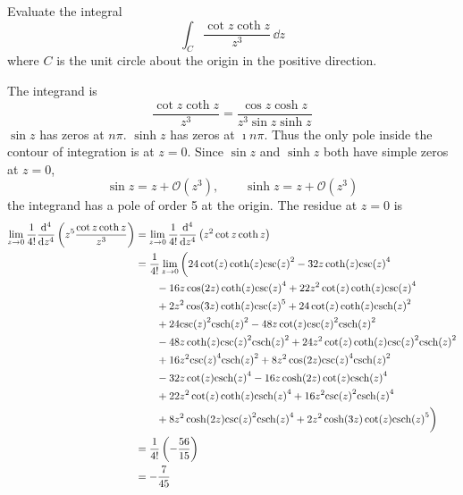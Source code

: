 \begin{Example}
  Evaluate the integral
  \[
  \int_C \frac{\cot z  \coth z}{z^3} \,\dd z
  \]
  where $C$ is the unit circle about the origin in the positive direction.

  The integrand is
  \[
  \frac{\cot z  \coth z}{z^3} = \frac{\cos z \cosh z}{z^3 \sin z  \sinh z}
  \]
  $\sin z$ has zeros at $n\pi$.  $\sinh z$ has zeros at $\imath n \pi$.  Thus
  the only pole inside the contour of integration is at $z = 0$.
  Since $\sin z$ and $\sinh z$ both have simple zeros at $z=0$,
  \[
  \sin z = z + \mathcal{O}(z^3), \qquad \sinh z = z + \mathcal{O}(z^3)
  \]
  the integrand has a pole of order 5 at the origin.
  The residue at $z=0$ is
  \begin{align*}
    \lim_{z \to 0} \frac{1}{4!} \frac{\mathrm{d}^4}{\mathrm{d} z^4} \left( z^5
      \frac{\cot z  \coth z}{z^3} \right)
    &= \lim_{z \to 0} \frac{1}{4!} \frac{\mathrm{d}^4}{\mathrm{d} z^4} \left( z^2
      \cot z  \coth z \right) \\
    &= \frac{1}{4!} \lim_{z \to 0} \bigg(
    24 \cot (z) \coth (z) {{\csc (z)}^2} -
    32 z \coth (z) {{\csc (z)}^4}  \\
    &\qquad -
    16 z \cos (2 z) \coth (z) {{\csc (z)}^4} +
    22 {z^2} \cot (z) \coth (z) {{\csc (z)}^4}  \\
    &\qquad +
    2 {z^2} \cos (3 z) \coth (z) {{\csc (z)}^5} +
    24 \cot (z) \coth (z) {{{\mathop{\mathrm{csch}}\nolimits}(z)}^2} \\
    &\qquad +
    24 {{\csc (z)}^2} {{{\mathop{\mathrm{csch}}\nolimits}(z)}^2} -
    48 z \cot (z) {{\csc (z)}^2} {{{\mathop{\mathrm{csch}}\nolimits}(z)}^2}  \\
    &\qquad -
    48 z \coth (z) {{\csc (z)}^2} {{{\mathop{\mathrm{csch}}\nolimits}(z)}^2} +
    24 {z^2} \cot (z) \coth (z) {{\csc (z)}^2}
    {{{\mathop{\mathrm{csch}}\nolimits}(z)}^2} \\
    &\qquad + 16 {z^2} {{\csc (z)}^4}
    {{{\mathop{\mathrm{csch}}\nolimits}(z)}^2} + 8 {z^2} \cos (2 z)
    {{\csc (z)}^4} {{{\mathop{\mathrm{csch}}\nolimits}(z)}^2}  \\
    &\qquad -
    32 z \cot (z) {{{\mathop{\mathrm{csch}}\nolimits}(z)}^4} -
    16 z \cosh (2 z) \cot (z) {{{\mathop{\mathrm{csch}}\nolimits}(z)}^4}  \\
    &\qquad +
    22 {z^2} \cot (z) \coth (z) {{{\mathop{\mathrm{csch}}\nolimits}(z)}^4} +
    16 {z^2} {{\csc (z)}^2} {{{\mathop{\mathrm{csch}}\nolimits}(z)}^4} \\
    &\qquad +
    8 {z^2} \cosh (2 z) {{\csc (z)}^2}
    {{{\mathop{\mathrm{csch}}\nolimits}(z)}^4} + 2 {z^2} \cosh (3 z) \cot (z)
    {{{\mathop{\mathrm{csch}}\nolimits}(z)}^5} \bigg) \\
    &= \frac{1}{4!} \left( -\frac{56}{15} \right) \\
    &= -\frac{7}{45}
  \end{align*}


\end{Example}
